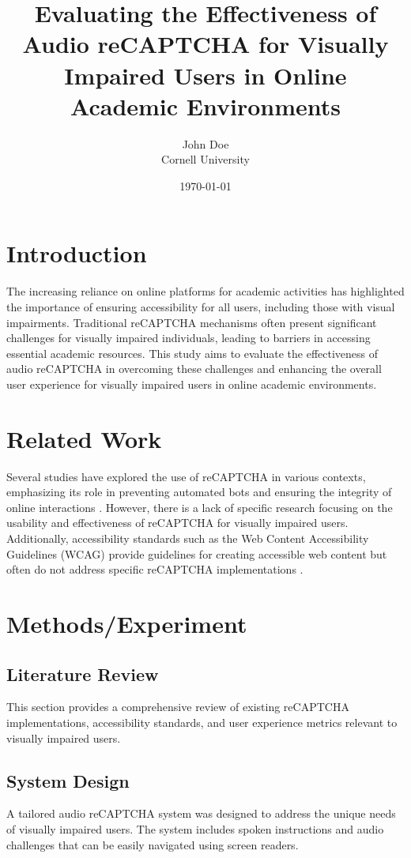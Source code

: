 \documentclass{article}
\title{Evaluating the Effectiveness of Audio reCAPTCHA for Visually Impaired Users in Online Academic Environments}
\author{John Doe \\ Cornell University}
\date{\today}
\begin{document}
\maketitle

\section{Introduction}
\label{sec:introduction}

The increasing reliance on online platforms for academic activities has highlighted the importance of ensuring accessibility for all users, including those with visual impairments. Traditional reCAPTCHA mechanisms often present significant challenges for visually impaired individuals, leading to barriers in accessing essential academic resources. This study aims to evaluate the effectiveness of audio reCAPTCHA in overcoming these challenges and enhancing the overall user experience for visually impaired users in online academic environments.

\section{Related Work}
\label{sec:related_work}

Several studies have explored the use of reCAPTCHA in various contexts, emphasizing its role in preventing automated bots and ensuring the integrity of online interactions \cite{ref1, ref2}. However, there is a lack of specific research focusing on the usability and effectiveness of reCAPTCHA for visually impaired users. Additionally, accessibility standards such as the Web Content Accessibility Guidelines (WCAG) provide guidelines for creating accessible web content but often do not address specific reCAPTCHA implementations \cite{ref3}.

\section{Methods/Experiment}
\label{sec:methods}

\subsection{Literature Review}
This section provides a comprehensive review of existing reCAPTCHA implementations, accessibility standards, and user experience metrics relevant to visually impaired users.

\subsection{System Design}
A tailored audio reCAPTCHA system was designed to address the unique needs of visually impaired users. The system includes spoken instructions and audio challenges that can be easily navigated using screen readers.
\end{document}
